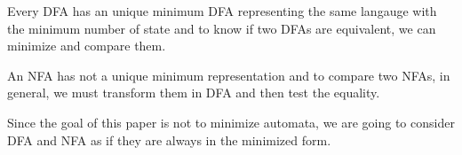 \begin{theorem}
  Every DFA has an unique minimum DFA representing the same langauge with the minimum number of state and to know if two DFAs are equivalent, we can minimize and compare them.
\end{theorem}

\begin{theorem}
  An NFA has not a unique minimum representation and to compare two NFAs, in general, we must transform them in DFA and then test the equality.
\end{theorem}

Since the goal of this paper is not to minimize automata, we are going to consider DFA and NFA as if they are always in the minimized form.